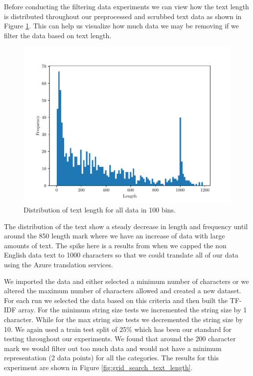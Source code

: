 Before conducting the filtering data experiments we can view how the text length is distributed throughout our preprocessed and scrubbed text data as shown in Figure \ref{fig:string_length_dist}. This can help us visualize how much data we may be removing if we filter the data based on text length.

\begin{figure}[h]
    \centering
    \includegraphics[width=\scale\textwidth]{../img/plot_string_length_dist_all_data.pdf}
    \caption{Distribution of text length for all data in 100 bins.}
    \label{fig:string_length_dist}
\end{figure}

The distribution of the text show a steady decrease in length and frequency until around the 850 length mark where we have an increase of data with large amounts of text. The spike here is a results from when we capped the non English data text to 1000 characters so that we could translate all of our data using the Azure translation services.

We imported the data and either selected a minimum number of characters or we altered the maximum number of characters allowed and created a new dataset. For each run we selected the data based on this criteria and then built the TF-IDF array. For the minimum string size tests we incremented the string size by 1 character. While for the max string size tests we decremented the string size by 10. We again used a train test split of 25\% which has been our standard for testing throughout our experiments. We found that around the 200 character mark we would filter out too much data and would not have a minimum representation (2 data points) for all the categories. The results for this experiment are shown in Figure \ref{fig:grid_search_text_length}.

